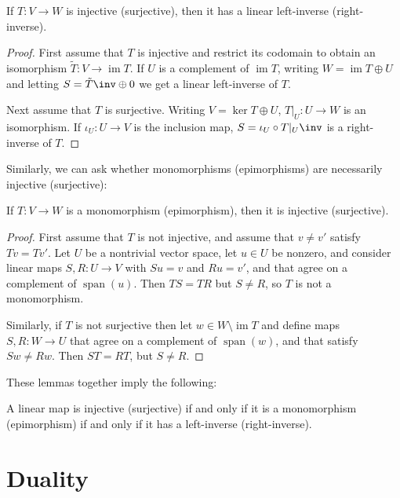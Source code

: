 \documentclass[a4paper, 11pt]{memoir}
\numberwithin{equation}{chapter}
\DeclareMathOperator{\Span}{span}
\newcommand{\im}{\operatorname{im}}
\begin{document}
\begin{lemma}
    If $T \colon V \to W$ is injective (surjective), then it has a linear left-inverse (right-inverse).
\end{lemma}

\begin{proof}
    First assume that $T$ is injective and restrict its codomain to obtain an isomorphism $\tilde{T} \colon V \to \im T$. If $U$ is a complement of $\im T$, writing $W = \im T \oplus U$ and letting $S = \tilde{T}\inv \oplus 0$ we get a linear left-inverse of $T$.

    Next assume that $T$ is surjective. Writing $V = \ker T \oplus U$, $T|_U \colon U \to W$ is an isomorphism. If $\iota_U \colon U \to V$ is the inclusion map, $S = \iota_U \circ T|_U\inv$ is a right-inverse of $T$.
\end{proof}
%
Similarly, we can ask whether monomorphisms (epimorphisms) are necessarily injective (surjective):

\begin{lemma}
    If $T \colon V \to W$ is a monomorphism (epimorphism), then it is injective (surjective).
\end{lemma}

\begin{proof}
    First assume that $T$ is not injective, and assume that $v \neq v'$ satisfy $Tv = Tv'$. Let $U$ be a nontrivial vector space, let $u \in U$ be nonzero, and consider linear maps $S,R \colon U \to V$ with $Su = v$ and $Ru = v'$, and that agree on a complement of $\Span(u)$. Then $TS = TR$ but $S \neq R$, so $T$ is not a monomorphism.

    Similarly, if $T$ is not surjective then let $w \in W \setminus \im T$ and define maps $S,R \colon W \to U$ that agree on a complement of $\Span(w)$, and that satisfy $Sw \neq Rw$. Then $ST = RT$, but $S \neq R$.
\end{proof}
%
These lemmas together imply the following:

\begin{theoremnoproof}
    A linear map is injective (surjective) if and only if it is a monomorphism (epimorphism) if and only if it has a left-inverse (right-inverse).
\end{theoremnoproof}




\section{Duality}
\end{document}
